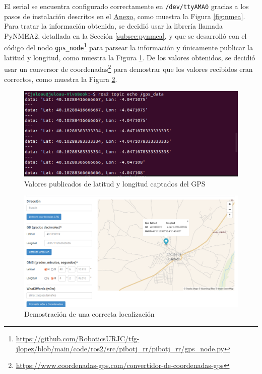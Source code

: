 El serial se encuentra configurado correctamente en \verb|/dev/ttyAMA0| gracias a los pasos de instalación descritos en el \hyperref[cap:capitulo9]{Anexo}, como muestra la Figura \ref{fig:nmea}. Para tratar la información obtenida, se decidió usar la librería llamada PyNMEA2, detallada en la Sección \ref{subsec:pynmea}, y que se desarrolló con el código del nodo \verb|gps_node|\footnote{\url{https://github.com/RoboticsURJC/tfg-jlopez/blob/main/code/ros2/src/pibotj_rr/pibotj_rr/gps_node.py}} para parsear la información y únicamente publicar la latitud y longitud, como muestra la Figura \ref{fig:gpsnode}. De los valores obtenidos, se decidió usar un conversor de coordenadas\footnote{\url{https://www.coordenadas-gps.com/convertidor-de-coordenadas-gps}} para demostrar que los valores recibidos eran correctos, como muestra la Figura \ref{fig:demogpsnode}.


 \begin{figure} [h!]
	\begin{center}
		\includegraphics[width=12cm]{figs/cap6/echo_gps_controller.png}
	\end{center}
	\caption{Valores publicados de latitud y longitud captados del GPS}
	\label{fig:gpsnode}
\end{figure}


 \begin{figure} [h!]
	\begin{center}
		\includegraphics[width=15cm]{figs/cap6/localizacion.png}
	\end{center}
	\caption{Demostración de una correcta localización}
	\label{fig:demogpsnode}
\end{figure}

